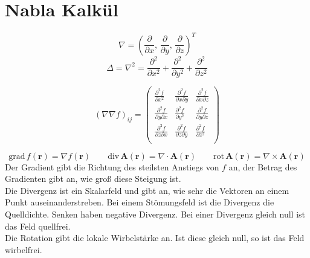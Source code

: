 \section{Nabla Kalkül}

\begin{frameddefn}
\[
\nabla = \left( \frac{\partial}{\partial x},\, \frac{\partial}{\partial y},\, \frac{\partial}{\partial z} \right)^T
\]
\[
\Delta = \nabla^2 = \frac{\partial^2}{\partial x^2} + \frac{\partial^2}{\partial y^2} + \frac{\partial^2}{\partial z^2}
\]
\end{frameddefn}

\begin{frameddefn}
\[
(\nabla\nabla f)_{ij} = 
\left(\begin{array}{rrr} 
	\frac{\partial^2 f}{\partial x^2} & \frac{\partial^2 f}{\partial x \partial y} & \frac{\partial^2 f}{\partial x \partial z} \\ 
	\frac{\partial^2 f}{\partial y \partial x} & \frac{\partial^2 f}{\partial y^2} & \frac{\partial^2 f}{\partial y \partial z} \\ 
	\frac{\partial^2 f}{\partial z \partial x} & \frac{\partial^2 f}{\partial z \partial y} & \frac{\partial^2 f}{\partial z^2} \\ 
\end{array}\right)
\]
\end{frameddefn}

\begin{frameddefn}
\[
\textrm{grad}\, f(\mathbf{r}) = \nabla f(\mathbf{r}) \qquad
\textrm{div}\, \mathbf{A}(\mathbf{r}) = \nabla \cdot \mathbf{A}(\mathbf{r}) \qquad
\textrm{rot}\, \mathbf{A}(\mathbf{r}) = \nabla \times \mathbf{A}(\mathbf{r})
\]
Der Gradient gibt die Richtung des steilsten Anstiegs von $f$ an, der Betrag des Gradienten gibt an, wie groß diese Steigung ist.\\Die Divergenz ist ein Skalarfeld und gibt an, wie sehr die Vektoren an einem Punkt auseinanderstreben. Bei einem Stömungsfeld ist die Divergenz die Quelldichte. Senken haben negative Divergenz. Bei einer Divergenz gleich null ist das Feld quellfrei.\\Die Rotation gibt die lokale Wirbelstärke an. Ist diese gleich null, so ist das Feld wirbelfrei.
\end{frameddefn}

